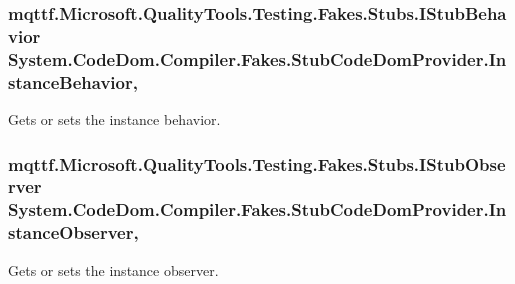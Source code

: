 \hypertarget{class_system_1_1_code_dom_1_1_compiler_1_1_fakes_1_1_stub_code_dom_provider_ae84a4d6a9ee4af6fdd229596868e59d4}{
\subsubsection[{Instance\-Behavior}]{\setlength{\rightskip}{0pt plus 5cm}mqttf.\-Microsoft.\-Quality\-Tools.\-Testing.\-Fakes.\-Stubs.\-I\-Stub\-Behavior System.\-Code\-Dom.\-Compiler.\-Fakes.\-Stub\-Code\-Dom\-Provider.\-Instance\-Behavior\hspace{0.3cm}{\ttfamily [get]}, {\ttfamily [set]}}}\label{class_system_1_1_code_dom_1_1_compiler_1_1_fakes_1_1_stub_code_dom_provider_ae84a4d6a9ee4af6fdd229596868e59d4}


Gets or sets the instance behavior.

\hypertarget{class_system_1_1_code_dom_1_1_compiler_1_1_fakes_1_1_stub_code_dom_provider_a3fa0d834c673ecfe5779034704a12c9b}{
\subsubsection[{Instance\-Observer}]{\setlength{\rightskip}{0pt plus 5cm}mqttf.\-Microsoft.\-Quality\-Tools.\-Testing.\-Fakes.\-Stubs.\-I\-Stub\-Observer System.\-Code\-Dom.\-Compiler.\-Fakes.\-Stub\-Code\-Dom\-Provider.\-Instance\-Observer\hspace{0.3cm}{\ttfamily [get]}, {\ttfamily [set]}}}\label{class_system_1_1_code_dom_1_1_compiler_1_1_fakes_1_1_stub_code_dom_provider_a3fa0d834c673ecfe5779034704a12c9b}


Gets or sets the instance observer.

